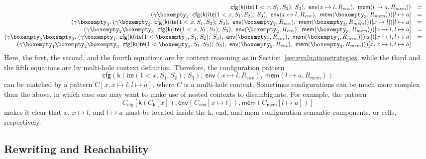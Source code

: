 \documentclass[UTF8,11pt]{article}
\theoremstyle{plain}
\theoremstyle{definition}
\theoremstyle{remark}
\newcommand{\hole}{\boxempty}
\newcommand{\ite}{\textsf{ite}}
\begin{document}
$$
\begin{array}{@{}rcl}
\textsf{cfg}
(
\textsf{k}(\ite(1 < x,S_1,S_2)\textsf{;\ }S_3),
\ \textsf{env}(x \mapsto l, R_\textit{env})
,
\ \textsf{mem}(l \mapsto a, R_\textit{mem})
)
&=&
\\
(\gamma\hole_3.\;\textsf{cfg}
(
\textsf{k}(\ite(1 < x,S_1,S_2)\textsf{;\ }S_3),
\ \textsf{env}(x \mapsto l, R_\textit{env})
,
\ \textsf{mem}(\hole_3,R_\textit{mem})))[l \mapsto a]
&=&
\\
(\gamma\hole_3.\;
(\gamma\hole_2.\;
\textsf{cfg}
(
\textsf{k}(\ite(1 < x,S_1,S_2)\textsf{;\ }S_3),
\ \textsf{env}(\hole_2, R_\textit{env})
,
\ \textsf{mem}(\hole_3,R_\textit{mem})))[x \mapsto l])[l \mapsto a]
&=&
\\
(\gamma\hole_2\hole_3.\;
\textsf{cfg}
(
\textsf{k}(\ite(1 < x,S_1,S_2)\textsf{;\ }S_3),
\ \textsf{env}(\hole_2, R_\textit{env})
,
\ \textsf{mem}(\hole_3,R_\textit{mem})))[x \mapsto l,l \mapsto a]
&=&
\\
(\gamma\hole_2\hole_3.\;
(\gamma\hole_1.\;
\textsf{cfg}
(
\textsf{k}(\ite(1 < \hole_1,S_1,S_2)\textsf{;\ }S_3),
\ \textsf{env}(\hole_2, R_\textit{env})
,
\ \textsf{mem}(\hole_3,R_\textit{mem})))[x]
)[x \mapsto l,l \mapsto a]
&=&
\\
(\gamma\hole_1\hole_2\hole_3.\;
\textsf{cfg}
(
\textsf{k}(\ite(1 < \hole_1,S_1,S_2)\textsf{;\ }S_3),
\ \textsf{env}(\hole_2, R_\textit{env})
,
\ \textsf{mem}(\hole_3, R_\textit{mem})
))
[x, x \mapsto l, l \mapsto a]
\end{array}
$$
Here, the first, the second, and the fourth equations
are by context reasoning as in Section~\ref{sec:evaluationstrategies}
while the third and the fifth equations are by
multi-hole context definition.
Therefore, the configuration pattern
$$
\textsf{cfg}
(
\textsf{k}(\ite(1 < x,S_1,S_2)\textsf{;\ }S_3),
\ \textsf{env}(x \mapsto l, R_\textit{env})
,
\ \textsf{mem}(l \mapsto a, R_\textit{mem})
)
$$
can be matched by a pattern $C[x,x\mapsto l,l\mapsto a]$, where $C$ is a
multi-hole context.
Sometimes configurations can be much more complex than the above, in which
case one may want to make use of nested contexts to disambiguate.
For example, the pattern
$$
C_{\textsf{cfg}}[\textsf{k}(C_{\textsf{k}}[x]),\textsf{env}(C_{\textsf{env}}[x\mapsto l]),\textsf{mem}(C_{\textsf{mem}}[l\mapsto a])]
$$
makes it clear that $x$, $x\mapsto l$, and $l\mapsto a$ must be located inside
the \textsf{k}, \textsf{end}, and \textsf{mem} configuration semantic
components, or cells, respectively.

\subsection{Rewriting and Reachability}
\label{sec:rewriting}
\end{document}
